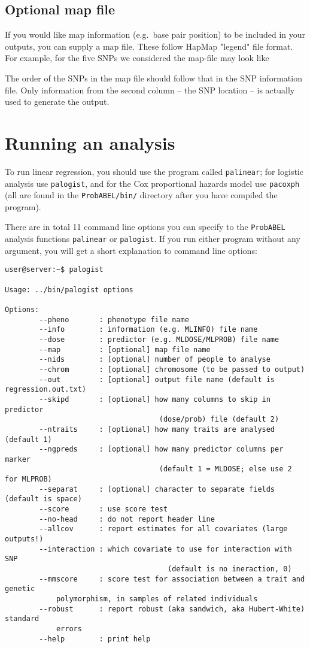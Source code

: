 \documentclass[12pt,a4paper]{article}
\begin{document}
\subsection{Optional map file}
If you would like map information (e.g.~base pair position) to
be included in your outputs, you can supply a map file. These follow
HapMap "legend" file format. For example, for the five SNPs we considered
the map-file may look like



The order of the SNPs in the map file should follow that in the SNP information
file. Only information from the second column -- the SNP location -- is
actually used to generate the output.

\section{Running an analysis}
To run linear regression, you should use the program called
\texttt{palinear}; for logistic analysis use \texttt{palogist}, and
for the Cox proportional hazards model use \texttt{pacoxph} (all are
found in the \texttt{ProbABEL/bin/} directory after you have compiled
the program).

There are in total 11 command line options you can specify to the
\texttt{ProbABEL} analysis functions \texttt{palinear} or
\texttt{palogist}. If you run either program without any argument, you
will get a short explanation to command line options:
\begin{verbatim}
user@server:~$ palogist

Usage: ../bin/palogist options

Options:
		--pheno       : phenotype file name
		--info        : information (e.g. MLINFO) file name
		--dose        : predictor (e.g. MLDOSE/MLPROB) file name
		--map         : [optional] map file name
		--nids        : [optional] number of people to analyse
		--chrom       : [optional] chromosome (to be passed to output)
		--out         : [optional] output file name (default is regression.out.txt)
		--skipd       : [optional] how many columns to skip in predictor
								    (dose/prob) file (default 2)
		--ntraits     : [optional] how many traits are analysed (default 1)
		--ngpreds     : [optional] how many predictor columns per marker
								    (default 1 = MLDOSE; else use 2 for MLPROB)
		--separat     : [optional] character to separate fields (default is space)
		--score       : use score test
		--no-head     : do not report header line
		--allcov      : report estimates for all covariates (large outputs!)
		--interaction : which covariate to use for interaction with SNP
									  (default is no ineraction, 0)
		--mmscore     : score test for association between a trait and genetic
		    polymorphism, in samples of related individuals
		--robust      : report robust (aka sandwich, aka Hubert-White) standard
		    errors
		--help        : print help
\end{verbatim}
\end{document}
